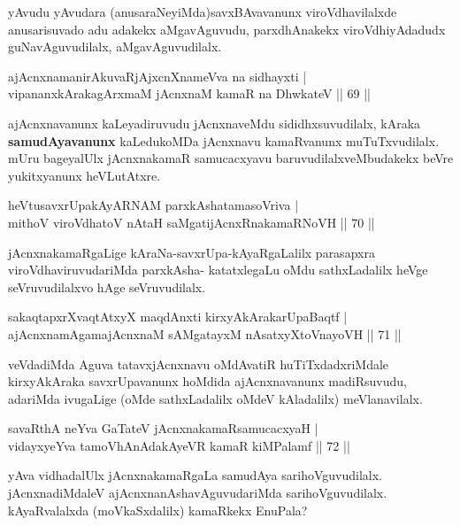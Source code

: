 \begin{artha}
yAvudu yAvudara (anusaraNeyiMda)savxBAvavanunx viroVdhavilalxde anusarisuvado adu adakekx aMgavAguvudu, parxdhAnakekx viroVdhiyAdadudx guNavAguvudilalx, aMgavAguvudilalx.
\end{artha}

\begin{shl}
ajAcnxnamanirAkuvaRjAjxcnXnameVva na sidhayxti |\\
vipananxkArakagArxmaM jAcnxnaM kamaR na DhwkateV \hfill || 69 ||
\end{shl}

\begin{artha}
ajAcnxnavanunx kaLeyadiruvudu jAcnxnaveMdu sididhxsuvudilalx, kAraka \textbf{samudAyavanunx} kaLedukoMDa jAcnxnavu kamaRvanunx muTuTxvudilalx. mUru bageyalUlx jAcnxnakamaR samucacxyavu baruvudilalxveMbudakekx beVre yukitxyanunx heVLutAtxre.
\end{artha}

\begin{shl}
heVtusavxrUpakAyARNAM parxkAshatamasoVriva |\\
mithoV viroVdhatoV nAtaH saMgatijAcnxRnakamaRNoVH \hfill || 70 ||
\end{shl}

\begin{artha}
jAcnxnakamaRgaLige kAraNa-savxrUpa-kAyaRgaLalilx parasapxra viroVdhaviruvudariMda parxkAsha- katatxlegaLu oMdu sathxLadalilx heVge seVruvudilalxvo hAge seVruvudilalx.
\end{artha}

\begin{shl}
sakaqtapxrXvaqtAtxyX maqdAnxti kirxyAkArakarUpaBaqtf |\\
ajAcnxnamAgamajAcnxnaM sAMgatayxM nAsatxyXtoV\s nayoVH \hfill || 71 ||
\end{shl}

\begin{artha}
veVdadiMda Aguva tatavxjAcnxnavu oMdAvatiR huTiTxdadxriMdale kirxyAkAraka savxrUpavanunx hoMdida ajAcnxnavanunx madiRsuvudu, adariMda ivugaLige (oMde sathxLadalilx oMdeV kAladalilx) meVlanavilalx.
\end{artha}

\begin{shl}
savaRthA neYva GaTateV jAcnxnakamaRsamucacxyaH |\\
vidayxyeYva tamoVhAnAdakAyeVR kamaR kiMPalamf \hfill || 72 ||
\end{shl}

\begin{artha}
yAva vidhadalUlx jAcnxnakamaRgaLa samudAya sarihoVguvudilalx. jAcnxnadiMdaleV ajAcnxnanAshavAguvudariMda sarihoVguvudilalx. kAyaRvalalxda (moVkaSxdalilx) kamaRkekx EnuPala?
\end{artha}


